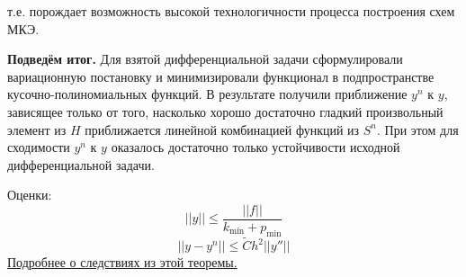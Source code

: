 \documentclass[specialist, subf, href, colorlinks=true, 12pt, times, mtpro, final]{disser}
\theoremstyle{definition}
\begin{document}
{    т.е. порождает возможность высокой технологичности процесса построения схем МКЭ.
    \par \textbf{Подведём итог.} Для взятой дифференциальной задачи сформулировали вариационную постановку и минимизировали функционал в подпространстве кусочно-полиномиальных функций. В результате получили приближение $y^n$ к $y$, зависящее только от того, насколько хорошо достаточно гладкий произвольный элемент из $H$ приближается линейной комбинацией функций из $S^n$. При этом для сходимости $y^n$ к $y$ оказалось достаточно только устойчивости исходной дифференциальной задачи.
    \par Оценки:
    $$
        ||y|| \le \frac{||f||}{k_{\text{min}} + p_{\text{min}}}
    $$
    $$
        ||y - y^n|| \le \tilde{C} h^2 ||y''||
    $$
    \hyperlink {lects.105}{Подробнее о следствиях из этой теоремы.}

}
\end{document}

